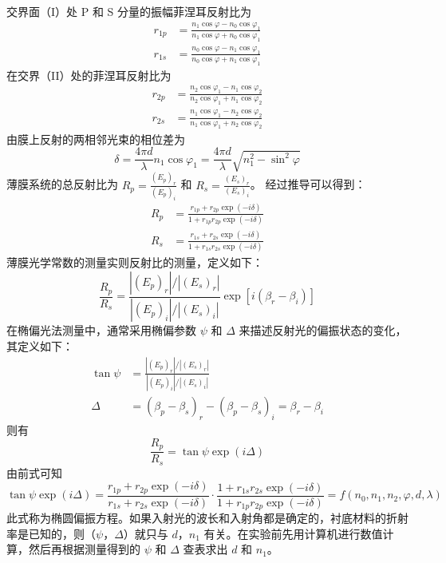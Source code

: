 \documentclass[11pt]{article}
\begin{document}
交界面（I）处 P 和 S 分量的振幅菲涅耳反射比为
\begin{align}
r_{1p} &= \frac{n_1 \cos\varphi - n_0 \cos\varphi_1}{n_1 \cos\varphi + n_0 \cos\varphi_1} \\
r_{1s} &= \frac{n_0 \cos\varphi - n_1 \cos\varphi_1}{n_0 \cos\varphi + n_1 \cos\varphi_1}
\end{align}
在交界（II）处的菲涅耳反射比为
\begin{align}
r_{2p} &= \frac{n_2 \cos\varphi_1 - n_1 \cos\varphi_2}{n_2 \cos\varphi_1 + n_1 \cos\varphi_2} \\
r_{2s} &= \frac{n_1 \cos\varphi_1 - n_2 \cos\varphi_2}{n_1 \cos\varphi_1 + n_2 \cos\varphi_2}
\end{align}
由膜上反射的两相邻光束的相位差为
\begin{equation}
\delta = \frac{4\pi d}{\lambda} n_1 \cos\varphi_1 = \frac{4\pi d}{\lambda} \sqrt{n_1^2 - \sin^2\varphi}
\end{equation}
薄膜系统的总反射比为 $R_p = \frac{(E_p)_r}{(E_p)_i}$ 和 $R_s = \frac{(E_s)_r}{(E_s)_i}$。
经过推导可以得到：
\begin{align}
R_p &= \frac{r_{1p} + r_{2p} \exp(-i\delta)}{1 + r_{1p} r_{2p} \exp(-i\delta)} \\
R_s &= \frac{r_{1s} + r_{2s} \exp(-i\delta)}{1 + r_{1s} r_{2s} \exp(-i\delta)}
\end{align}
薄膜光学常数的测量实则反射比的测量，定义如下：
\begin{equation}
\frac{R_p}{R_s} = \frac{|(E_p)_r| / |(E_s)_r|}{|(E_p)_i| / |(E_s)_i|} \exp[i(\beta_r - \beta_i)]
\end{equation}
在椭偏光法测量中，通常采用椭偏参数 $\psi$ 和 $\Delta$ 来描述反射光的偏振状态的变化，其定义如下：
\begin{align}
\tan\psi &= \frac{|(E_p)_r| / |(E_s)_r|}{|(E_p)_i| / |(E_s)_i|} \\
\Delta &= (\beta_p - \beta_s)_r - (\beta_p - \beta_s)_i = \beta_r - \beta_i
\end{align}
则有
\begin{equation}
\frac{R_p}{R_s} = \tan\psi \exp(i\Delta)
\end{equation}
由前式可知
\begin{equation}
\tan\psi \exp(i\Delta) = \frac{r_{1p} + r_{2p} \exp(-i\delta)}{r_{1s} + r_{2s} \exp(-i\delta)} \cdot \frac{1 + r_{1s} r_{2s} \exp(-i\delta)}{1 + r_{1p} r_{2p} \exp(-i\delta)} = f(n_0, n_1, n_2, \varphi, d, \lambda)
\end{equation}
此式称为椭圆偏振方程。如果入射光的波长和入射角都是确定的，衬底材料的折射率是已知的，则（$\psi$，$\Delta$）就只与 $d$，$n_1$ 有关。在实验前先用计算机进行数值计算，然后再根据测量得到的 $\psi$ 和 $\Delta$ 查表求出 $d$ 和 $n_1$。
\end{document}
